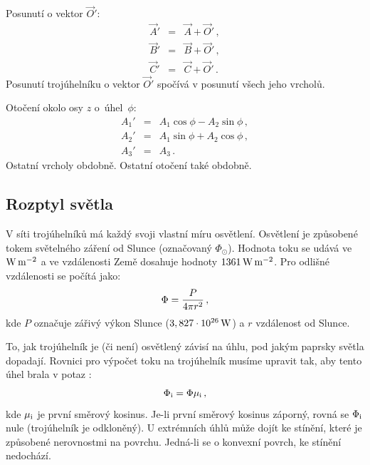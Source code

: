 \documentclass[11pt]{article}
\begin{document}
Posunutí o vektor $\vec O'$:
\begin{eqnarray}
\vec A' &=& \vec A + \vec O'\,,\\ 
\vec B' &=& \vec B + \vec O'\,,\\ 
\vec C' &=& \vec C + \vec O'\,.
\end{eqnarray}
Posunutí trojúhelníku o vektor $\vec O'$ spočívá v posunutí všech jeho vrcholů.

Otočení okolo osy $z$ o~úhel~$\phi$:
\begin{eqnarray}
A_1' &=& A_1\cos\phi - A_2\sin\phi\,,\\
A_2' &=& A_1\sin\phi + A_2\cos\phi\,,\\
A_3' &=& A_3\,.
\end{eqnarray}
Ostatní vrcholy obdobně.
Ostatní otočení také obdobně.

 

\subsection{Rozptyl světla}

V síti trojúhelníků má každý svoji vlastní míru osvětlení. Osvětlení je způsobené tokem světelného záření od Slunce (označovaný $\Phi_\odot$). Hodnota toku se udává ve ${\rm W}\,{\rm m}^{-2}$ a ve vzdálenosti Země dosahuje hodnoty $1361\,{\rm W}\,{\rm m}^{-2}$. Pro odlišné vzdálenosti se počítá jako:
\begin{equation}
\Phi = {P\over 4\pi r^2}\,,
\end{equation}
kde $P$ označuje zářivý výkon Slunce ($3,827 \cdot 10^{26}\,{\rm W}$) a $r$ vzdálenost od Slunce.

To, jak trojúhelník je (či není) osvětlený závisí na úhlu, pod jakým paprsky světla dopadají. Rovnici pro výpočet toku na trojúhelník musíme upravit tak, aby tento úhel brala v potaz \citep{Broz_2013}:
\begin{equation}
\Phi_{\rm i} = \Phi \mu_{\rm i}\,,
\end{equation}
kde $\mu_{\rm i}$ je první směrový kosinus. Je-li první směrový kosinus záporný, rovná se $\Phi_{\rm i}$ nule (trojúhelník je odkloněný). U extrémních úhlů může dojít ke stínění, které je způsobené nerovnostmi na povrchu. Jedná-li se o konvexní povrch, ke stínění nedochází.  
\end{document}
